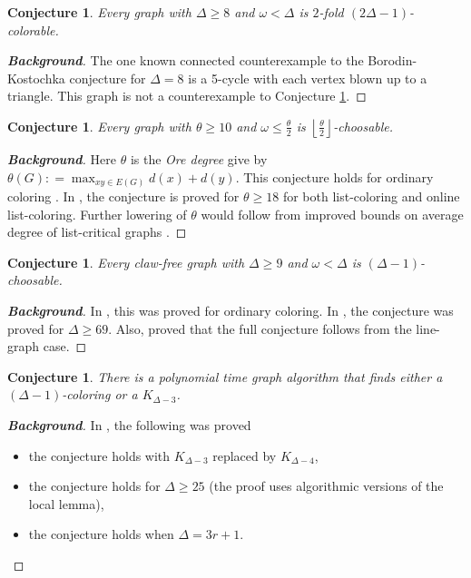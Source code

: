 \documentclass[12pt]{article}
\theoremstyle{plain}
\newtheorem{conjecture}[thm]{Conjecture}
\theoremstyle{definition}
\theoremstyle{remark}
\newcommand{\floor}[1]{\left\lfloor#1\right\rfloor}
\newcommand{\DefinedAs}{\mathrel{\mathop:}=}
\begin{document}
\begin{conjecture}\label{C6}
Every graph with $\Delta \ge 8$ and $\omega < \Delta$ is $2$-fold $(2\Delta - 1)$-colorable.
\end{conjecture}
\begin{proof}[\textbf{Background}]
The one known connected counterexample to the Borodin-Kostochka conjecture for $\Delta=8$ is a 5-cycle with each vertex blown up to a triangle.  This graph is not a counterexample to Conjecture \ref{C6}.
\end{proof}

\begin{conjecture} 
Every graph with $\theta\ge10$ and $\omega\leq\frac{\theta}{2}$ is $\floor{\frac{\theta}{2}}$-choosable. 
\end{conjecture}
\begin{proof}[\textbf{Background}]
Here $\theta$ is the \emph{Ore degree} give by $\theta(G)\DefinedAs\max_{xy\in E(G)}d(x) + d(y)$.  This conjecture holds for ordinary coloring \cite{kierstead2009ore, rabern2010a, krs_one, rabern2012partitioning}.
In \cite{KernelMagic}, the conjecture is proved for $\theta \ge 18$ for both list-coloring and online list-coloring.  Further lowering of $\theta$ would follow from improved bounds on average degree of list-critical graphs \cite{OreVizing}.
\end{proof}

\begin{conjecture}
Every claw-free graph with $\Delta \ge 9$ and $\omega < \Delta$ is $(\Delta-1)$-choosable.
\end{conjecture}
\begin{proof}[\textbf{Background}]
In \cite{cranstonrabernclaw}, this was proved for ordinary coloring. In \cite{BkClawList}, the conjecture was proved for $\Delta \ge 69$.  Also, \cite{BkClawList} proved that the full conjecture follows from the line-graph case.
\end{proof}

\begin{conjecture}
There is a polynomial time graph algorithm that finds either a $(\Delta-1)$-coloring or a $K_{\Delta-3}$.
\end{conjecture}
\begin{proof}[\textbf{Background}]
In \cite{bigcliques}, the following was proved
\begin{itemize}
\item the conjecture holds with $K_{\Delta-3}$ replaced by $K_{\Delta-4}$,
\item the conjecture holds for $\Delta \ge 25$ (the proof uses algorithmic versions of the local lemma),
\item the conjecture holds when $\Delta = 3r+1$.
\end{itemize}
\end{proof}



\end{document}
